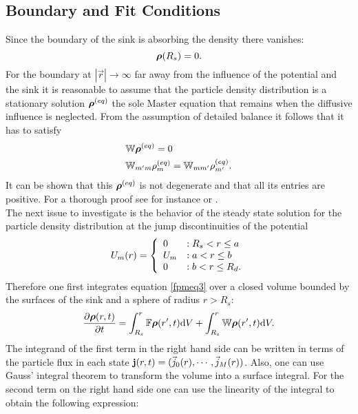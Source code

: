 \subsection{Boundary and Fit Conditions}
\label{Fit_Conditions}
Since the boundary of the sink is absorbing the density there vanishes:
\begin{equation}
    \boldsymbol{\mathbf{\rho}}(R_s) = 0.
    \label{bcrs}
\end{equation}
For the boundary at $|\vec{r}| \rightarrow \infty$ far away from the influence of the potential and the sink it is reasonable to assume that the particle density distribution is a stationary solution $\boldsymbol{\mathbf{\rho}}^{(eq)}$ the sole Master equation that remains when the diffusive influence is neglected. From the assumption of detailed balance it follows that it has to satisfy
\begin{align}
    &\mathbb{W} \boldsymbol{\mathbf{\rho}}^{(eq)} = 0 \nonumber \\
    &\mathbb{W}_{m'm} \rho_m^{(eq)} = \mathbb{W}_{mm'}\rho_{m'}^{(eq)}.
    \label{detailed_balance2}
\end{align}
It can be shown that this $\boldsymbol{\mathbf{\rho}}^{(eq)}$ is not degenerate and that all its entries are positive. For a thorough proof see for instance \cite{VanKampen1992} or \cite{Oppenheim1977}. \\
The next issue to investigate is the behavior of the steady state solution for the particle density distribution at the jump discontinuities of the potential 
\begin{equation}
  U_m(r) = \left\{ \begin{array}{l l} 
        0 &: R_s < r \le a \\
        U_m &: a<r \le b \\
        0 &: b < r \le R_d.
    \end{array} \right.
    \label{step_potential}
\end{equation}
Therefore one first integrates equation \eqref{fpmeq3} over a closed volume bounded by the surfaces of the sink and a sphere of radius $r>R_s$:
\begin{equation*}
    \frac{\partial \boldsymbol{\mathbf{\rho}}(r,t)}{\partial t} =  \int_{R_s}^{r}\mathbb{F}\boldsymbol{\mathbf{\rho}}(r',t){\rm d} V + \int_{R_s}^{r} \mathbb{W}\boldsymbol{\mathbf{\rho}}(r',t) {\rm d} V .
\end{equation*}
The integrand of the first term in the right hand side can be written in terms of the particle flux in each state $\boldsymbol{\mathbf{j}}(r,t) = (\vec{j}_{0}(r), \cdots , \vec{j}_{M}(r))$. Also, one can use Gauss' integral theorem to transform the volume into a surface integral. For the second term on the right hand side one can use the linearity of the integral to obtain the following expression:
